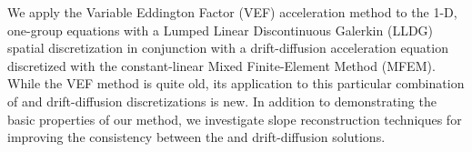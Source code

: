 We apply the Variable Eddington Factor (VEF) acceleration method to the 1-D, one-group \SN equations with a Lumped 
Linear Discontinuous Galerkin (LLDG) spatial discretization in conjunction with a drift-diffusion acceleration 
equation discretized with the constant-linear Mixed Finite-Element Method (MFEM).  While the VEF method is quite old, 
its application to this particular combination of \SN and drift-diffusion discretizations is new.  In addition to 
demonstrating the basic properties of our method, we investigate slope reconstruction techniques for improving the 
consistency between the \SN and drift-diffusion solutions.

